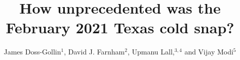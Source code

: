 \documentclass[12pt]{iopart}
\begin{document}
\title{How unprecedented was the February 2021 Texas cold snap?}

\author{James Doss-Gollin$^1$, David J. Farnham$^2$, Upmanu Lall,$^{3,4}$ and Vijay Modi$^5$}
\address{$^1$ Department of Civil and Environmental Engineering, Rice University, Houston, TX, USA (ORCID 0000-0002-3428-2224)}
\address{$^2$ Department of Global Ecology, Carnegie Institution for Science, Stanford, CA, USA (ORCID 0000-0002-6690-4251)}
\address{$^3$ Columbia Water Center, Columbia University, New York, NY, USA (ORCID 0000-0003-0529-8128)}
\address{$^4$ Department of Earth and Environmental Engineering, Columbia University, New York, NY, USA}
\address{$^4$ Department of Mechanical Engineering, Columbia University, New York, NY, USA (ORCID 0000-0003-2513-0437)}
\vspace{10pt}
\end{document}
